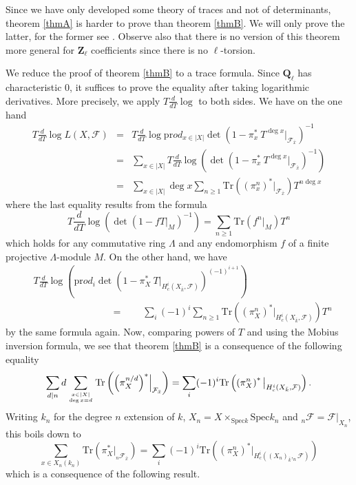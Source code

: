 \begin{remark}
Since we have only developed some theory of traces and not of determinants, theorem \ref{thmA} is harder to prove than theorem \ref{thmB}. We will only prove the latter, for the former see \cite{SGA4.5}. Observe also that there is no version of this theorem more general for $\mathbf{Z}_\ell$ coefficients since there is no $\ell$-torsion.
\end{remark}

We reduce the proof of theorem \ref{thmB} to a trace formula. Since $\mathbf{Q}_\ell$ has characteristic 0, it suffices to prove the equality after taking logarithmic derivatives. More precisely, we apply $T\frac{d}{dT} \log $ to both sides. We have on the one hand
\begin{eqnarray*}
T\frac{d}{dT}\log L(X, \mathcal{F}) & = & 
T\frac{d}{dT} \log \text{pr}od_{x\in |X|} \det\left(1-\pi_x^*\ T^{\deg x}\Big|_{\mathcal{F}_{\bar x}}\right)^{-1}\\
& = & \sum_{x\in |X|} T\frac{d}{dT} \log \left( \det\left(1-\pi_x^*\ T^{\deg x}\Big|_{\mathcal{F}_{\bar x}}\right)^{-1}\right) \\
&= & \sum_{x \in |X|} \deg x\sum_{n \geq 1} \text{Tr}\left({\left(\pi_x^n\right)}^*\big|_{\mathcal{F}_{\bar x}}\right) T^{n\deg x}
\end{eqnarray*}
where the last equality results from the formula
$$
T\frac{d}{dT}\log\left(\det\left(1-fT|_M\right)^{-1}\right) = \sum_{n\geq 1} \text{Tr}(f^n|_M)T^n
$$
which holds for any commutative ring $\Lambda$ and any endomorphism $f$ of a finite projective $\Lambda$-module $M$. On the other hand, we have
\begin{align*}
&T\frac{d}{dT} \log\left(\text{pr}od_i \det\left(1-\pi_X^*\ T\Big|_{H_c^i\left(X_{\bar k} , \mathcal{F}\right)}\right)^{(-1)^{i+1}}\right) \\
&\qquad\qquad\qquad \qquad = \qquad
\sum_i (-1)^i \sum_{n\geq 1} \text{Tr}\left({\left(\pi_X^n\right)}^*\big|_{H_c^i(X_{\bar k}, \mathcal{F})}\right) T^n
\end{align*}
by the same formula again. Now, comparing powers of $T$ and using the Mobius inversion formula, we see that theorem \ref{thmB} is a consequence of the following equality
$$
\sum_{d | n} d \sum_{x\in |X| \atop \deg x = d} \text{Tr} \left( {\left( \pi_X^{n/d} \right)}^* \Big|_{\mathcal{F}_{\bar x}} \right)
=
\sum_i (-1)^i \text{Tr}\left(\left(\pi^n_X\right)^*\big|_{H^i_c(X_{\bar k}, \mathcal{F})} \right).
$$
Writing $k_n$ for the degree $n$ extension of $k$, $X_n = X \times_{\text{Spec} k} \text{Spec} k_n$ and $_n \mathcal{F} = \mathcal{F}|_{X_n}$, this boils down to
$$
\sum_{x \in X_n(k_n)} \text{Tr}\left( \pi_X^*\big|_{_n\mathcal{F}_{\bar x}} \right)
=
\sum_i (-1)^i \text{Tr}\left(\left(\pi^n_X\right)^*\big|_{H^i_c({(X_n)}_{\bar k}, _n\mathcal{F})} \right)
$$
which is a consequence of the following result.

